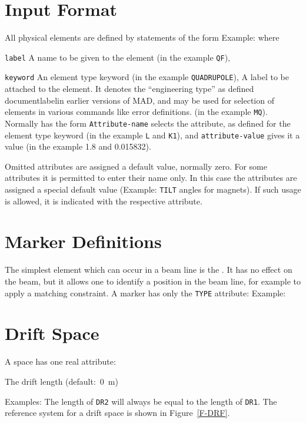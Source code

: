 \section{Input Format}
\label{S-ELMFORM}
All physical elements are defined by statements of the form
Example:
where
\begin{mylist}
\item[\tt label]
A name to be given to the element (in the example {\tt QF}),
\item[\tt keyword]
An element type keyword (in the example {\tt QUADRUPOLE}),
A label to be attached to the element.
It denotes the ``engineering type'' as defined
             documentlabelin earlier versions of MAD,
and may be used for selection of elements in various commands
like error definitions.
(in the example {\tt MQ}).
Normally has the form
{\tt Attribute-name} selects the attribute,
as defined for the element type keyword
(in the example {\tt L} and {\tt K1}),
and {\tt attribute-value} gives it a value
(in the example 1.8 and 0.015832).
\end{mylist}
Omitted attributes are assigned a default value, normally zero.
For some attributes it is permitted to enter their name only.
In this case the attributes are assigned a special default value
(Example: {\tt TILT} angles for magnets).
If such usage is allowed,
it is indicated with the respective attribute.
 
\section{Marker Definitions}
\label{S-MARK}
The simplest element which can occur in a beam line is the .
It has no effect on the beam,
but it allows one to identify a position in the beam line,
for example to apply a matching constraint.
A marker has only the {\tt TYPE} attribute:
Example:
 
\section{Drift Space}
\label{S-DRIFT}
A  space has one real attribute:
\begin{mylist}
The drift length (default:~0~m)
\end{mylist}
Examples:
The length of {\tt DR2} will always be equal to the length of {\tt DR1}.
The reference system for a drift space is shown in Figure~\ref{F-DRF}.
 
